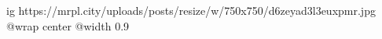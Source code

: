  
 
 
 
 

\ifcmt
  ig https://mrpl.city/uploads/posts/resize/w/750x750/d6zeyad3l3euxpmr.jpg
  @wrap center
  @width 0.9
\fi
